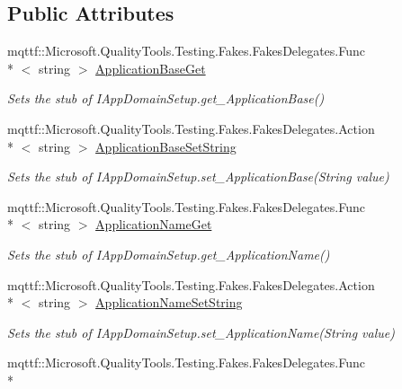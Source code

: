 \subsection*{Public Attributes}
\begin{DoxyCompactItemize}
\item 
mqttf\-::\-Microsoft.\-Quality\-Tools.\-Testing.\-Fakes.\-Fakes\-Delegates.\-Func\\*
$<$ string $>$ \hyperlink{class_system_1_1_fakes_1_1_stub_i_app_domain_setup_aaf566af49f571ef87683f66907a56af5}{Application\-Base\-Get}
\begin{DoxyCompactList}\small\item\em Sets the stub of I\-App\-Domain\-Setup.\-get\-\_\-\-Application\-Base()\end{DoxyCompactList}\item 
mqttf\-::\-Microsoft.\-Quality\-Tools.\-Testing.\-Fakes.\-Fakes\-Delegates.\-Action\\*
$<$ string $>$ \hyperlink{class_system_1_1_fakes_1_1_stub_i_app_domain_setup_a683fd866f2f4ba294bf9bed3dda73b32}{Application\-Base\-Set\-String}
\begin{DoxyCompactList}\small\item\em Sets the stub of I\-App\-Domain\-Setup.\-set\-\_\-\-Application\-Base(\-String value)\end{DoxyCompactList}\item 
mqttf\-::\-Microsoft.\-Quality\-Tools.\-Testing.\-Fakes.\-Fakes\-Delegates.\-Func\\*
$<$ string $>$ \hyperlink{class_system_1_1_fakes_1_1_stub_i_app_domain_setup_a0fcc4a08b942630200ad62e3ead492e6}{Application\-Name\-Get}
\begin{DoxyCompactList}\small\item\em Sets the stub of I\-App\-Domain\-Setup.\-get\-\_\-\-Application\-Name()\end{DoxyCompactList}\item 
mqttf\-::\-Microsoft.\-Quality\-Tools.\-Testing.\-Fakes.\-Fakes\-Delegates.\-Action\\*
$<$ string $>$ \hyperlink{class_system_1_1_fakes_1_1_stub_i_app_domain_setup_a72d895b68591832f8f4b5f1532558c52}{Application\-Name\-Set\-String}
\begin{DoxyCompactList}\small\item\em Sets the stub of I\-App\-Domain\-Setup.\-set\-\_\-\-Application\-Name(\-String value)\end{DoxyCompactList}\item 
mqttf\-::\-Microsoft.\-Quality\-Tools.\-Testing.\-Fakes.\-Fakes\-Delegates.\-Func\\*

\end{DoxyCompactItemize}
